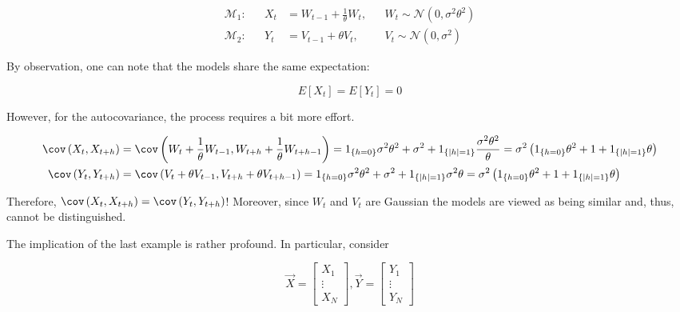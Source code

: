 \documentclass[]{book}
\theoremstyle{definition}
\theoremstyle{definition}
\theoremstyle{definition}
\theoremstyle{remark}
\begin{document}
{\[
\begin{aligned}
\mathcal{M}_1:&{}& X_t &= W_{t-1} + \frac{1}{\theta}W_t,&{}& W_t\sim \mathcal{N} (0, \sigma^2\theta^2) \\
\mathcal{M}_2:&{}& Y_t &= V_{t-1} + \theta V_t,&{}& V_t\sim \mathcal{N} (0,\sigma^2)
\end{aligned}
\]

By observation, one can note that the models share the same expectation:

\[E\left[ {{X_t}} \right] = E\left[ {{Y_t}} \right] = 0\]

However, for the autocovariance, the process requires a bit more effort.

\begin{align}
\cov \left( {{X_t},{X_{t + h}}} \right) &= \cov \left( {{W_t} + \frac{1}{\theta }{W_{t - 1}},{W_{t + h}} + \frac{1}{\theta }{W_{t + h - 1}}} \right) = {1_{\left\{ {h = 0} \right\}}}{\sigma ^2}{\theta ^2} + {\sigma ^2} + {1_{\left\{ {\left| h \right| = 1} \right\}}}\frac{{{\sigma ^2}{\theta ^2}}}{\theta } = {\sigma ^2}\left( {{1_{\left\{ {h = 0} \right\}}}{\theta ^2} + 1 + {1_{\left\{ {\left| h \right| = 1} \right\}}}\theta } \right) \\
\cov \left( {{Y_t},{Y_{t + h}}} \right) &= \cov \left( {{V_t} + \theta {V_{t - 1}},{V_{t + h}} + \theta {V_{t + h - 1}}} \right) = {1_{\left\{ {h = 0} \right\}}}{\sigma ^2}{\theta ^2} + {\sigma ^2} + {1_{\left\{ {\left| h \right| = 1} \right\}}}{\sigma ^2}\theta  = {\sigma ^2}\left( {{1_{\left\{ {h = 0} \right\}}}{\theta ^2} + 1 + {1_{\left\{ {\left| h \right| = 1} \right\}}}\theta } \right)
\end{align}

Therefore,
\(\cov \left( {{X_t},{X_{t + h}}} \right) = \cov \left( {{Y_t},{Y_{t + h}}} \right)\)!
Moreover, since \(W_t\) and \(V_t\) are Gaussian the models are viewed
as being similar and, thus, cannot be distinguished.

The implication of the last example is rather profound. In particular,
consider

\[\vec X = \left[ {\begin{array}{*{20}{c}}
  {{X_1}} \\ 
   \vdots  \\ 
  {{X_N}} 
\end{array}} \right],\vec Y = \left[ {\begin{array}{*{20}{c}}
  {{Y_1}} \\ 
   \vdots  \\ 
  {{Y_N}} 
\end{array}} \right]\]

}
\end{document}
